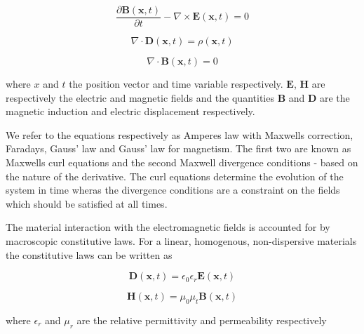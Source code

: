\begin{equation}
\frac{\partial \mathbf{B}(\mathbf{x}, t)}{\partial t}  - \nabla \times \mathbf{E}(\mathbf{x},t) = 0
\label{maxwell-faraday}
\end{equation}

\begin{equation}
\nabla \cdot \mathbf{D} (\mathbf{x},t) = \rho(\mathbf{x},t)
\label{maxwell-gauss-1}
\end{equation}

\begin{equation}
\nabla \cdot \mathbf{B} (\mathbf{x},t) = 0
\label{maxwell-gauss-2}
\end{equation}

where $x$ and $t$ the position vector and time variable respectively. $\mathbf{E}$, $\mathbf{H}$ are respectively the electric and magnetic fields and the quantities $\mathbf{B}$ and $\mathbf{D}$ are the magnetic induction and electric displacement respectively. 

We refer to the equations respectively as Amperes law with Maxwells correction, Faradays, Gauss' law and Gauss' law for magnetism. The first two are known as Maxwells curl equations and the second Maxwell divergence conditions - based on the nature of the derivative. The curl equations determine the evolution of the system in time wheras the divergence conditions are a constraint on the fields which should be satisfied at all times.

The material interaction with the electromagnetic fields is accounted for by macroscopic constitutive laws. For a linear, homogenous, non-dispersive materials the constitutive laws can be written as

\begin{equation}
\mathbf{D}(\mathbf{x},t) = \epsilon_0 \epsilon_r \mathbf{E}(\mathbf{x},t)
\label{contitutive-linear-non-dispersive-1}
\end{equation}

\begin{equation}
\mathbf{H}(\mathbf{x},t) = \mu_0 \mu_t \mathbf{B}(\mathbf{x},t)
\label{contitutive-linear-non-dispersive-2}
\end{equation}

where $\epsilon_r$ and $\mu_r$ are the relative permittivity and permeability respectively 


